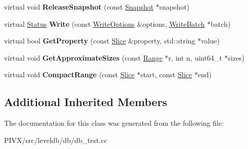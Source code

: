 \begin{DoxyCompactItemize}
\mbox{\label{classleveldb_1_1_model_d_b_a3f5d86ce612baaa88c11601c9a59df12}} 
virtual void {\bfseries Release\+Snapshot} (const \mbox{\hyperlink{classleveldb_1_1_snapshot}{Snapshot}} $\ast$snapshot)
\item 
\mbox{\label{classleveldb_1_1_model_d_b_ae3a20d2fc971376349b142b9c2d159be}} 
virtual \mbox{\hyperlink{classleveldb_1_1_status}{Status}} {\bfseries Write} (const \mbox{\hyperlink{structleveldb_1_1_write_options}{Write\+Options}} \&options, \mbox{\hyperlink{classleveldb_1_1_write_batch}{Write\+Batch}} $\ast$batch)
\item 
\mbox{\label{classleveldb_1_1_model_d_b_a5c83a50a08e45c2564c39a650ea55b86}} 
virtual bool {\bfseries Get\+Property} (const \mbox{\hyperlink{classleveldb_1_1_slice}{Slice}} \&property, std\+::string $\ast$value)
\item 
\mbox{\label{classleveldb_1_1_model_d_b_aeb5502077fae602c5ca3c1153f29b693}} 
virtual void {\bfseries Get\+Approximate\+Sizes} (const \mbox{\hyperlink{structleveldb_1_1_range}{Range}} $\ast$r, int n, uint64\+\_\+t $\ast$sizes)
\item 
\mbox{\label{classleveldb_1_1_model_d_b_a7a04a6e5227079f861c26b920df6b833}} 
virtual void {\bfseries Compact\+Range} (const \mbox{\hyperlink{classleveldb_1_1_slice}{Slice}} $\ast$start, const \mbox{\hyperlink{classleveldb_1_1_slice}{Slice}} $\ast$end)
\end{DoxyCompactItemize}
\subsection*{Additional Inherited Members}


The documentation for this class was generated from the following file\+:\begin{DoxyCompactItemize}
\item 
P\+I\+V\+X/src/leveldb/db/db\+\_\+test.\+cc\end{DoxyCompactItemize}
